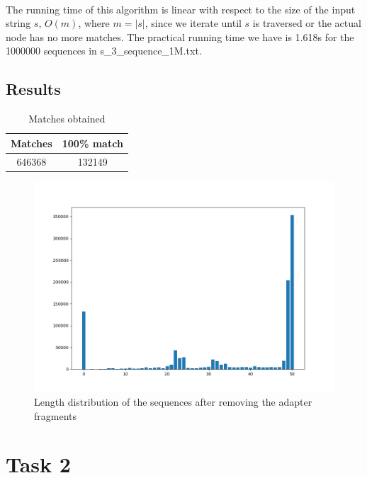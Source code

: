 \documentclass[a4paper,10pt]{article}
\begin{document}
\paragraph{} The running time of this algorithm is linear with respect to the size of the input string $s$, $O(m)$, where $m = |s|$, since we iterate until $s$ is traversed or the actual node has no more matches. The practical running time we have is 1.618s for the 1000000 sequences in s\_3\_sequence\_1M.txt.

\subsection{Results}

\begin{table}[H]
    \centering
    \begin{tabular}{| c | c |}
        \hline
        Matches & 100\% match \\
        \hline
        \hline
        646368 & 132149 \\
        \hline
    \end{tabular}
    \caption{Matches obtained}
\end{table}

\begin{figure}[H]
    \centering
    \includegraphics[width=12cm]{images/length-distr.png}
    \caption{Length distribution of the sequences after removing the adapter fragments}
    \label{length-distr}
\end{figure}

\newpage

\section{Task 2} \label{task2}
\end{document}
